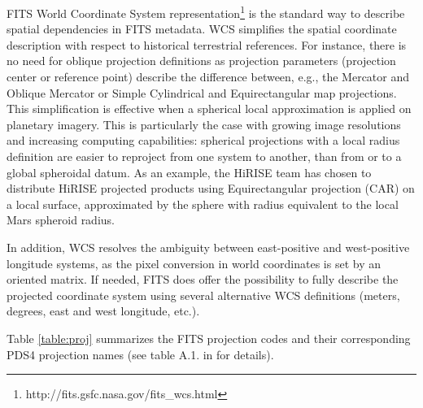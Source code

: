 FITS World Coordinate System
representation\footnote{http://fits.gsfc.nasa.gov/fits\_wcs.html} is the standard
way to describe spatial dependencies in FITS metadata.
WCS simplifies the spatial coordinate description with respect to historical
terrestrial references.
For instance, there is no need for oblique projection definitions
\citep{calagreisenI,Snyder1987} as projection parameters
(projection center or reference point)
describe the difference between, e.g., the Mercator and
Oblique Mercator or Simple Cylindrical and
Equirectangular map projections.
This simplification is effective when a spherical local approximation
is applied on planetary imagery.
This is particularly the case with growing image resolutions and
increasing computing capabilities: spherical projections with a local
radius definition are easier to reproject from one system to another, than
from or to a global spheroidal datum.
As an example, the HiRISE team has chosen to distribute HiRISE projected
products using Equirectangular projection (CAR) on a local surface, approximated
by the sphere with radius equivalent to the local Mars spheroid radius.

In addition, WCS resolves the ambiguity between east-positive and west-positive
longitude systems, as the pixel conversion in world coordinates is set by an
oriented matrix.
If needed, FITS does offer the possibility to fully describe the projected
coordinate system using several alternative WCS definitions (meters, degrees,
east and west longitude, etc.)\citep{greisencalaII}.

Table \ref{table:proj} summarizes the FITS projection codes and their
corresponding PDS4 projection names (see table A.1. in \citet{calagreisenI}
for details).

